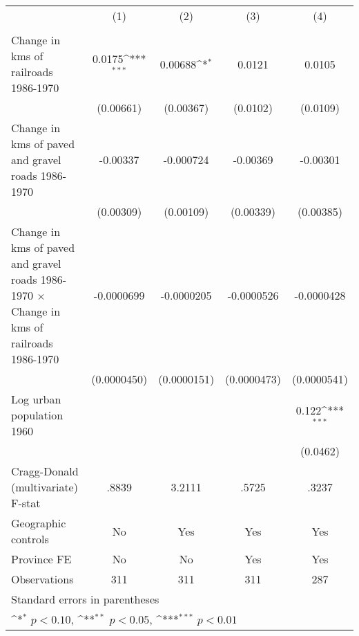 {
\def\sym#1{\ifmmode^{#1}\else\(^{#1}\)\fi}
\begin{tabular}{l*{4}{c}}
\hline\hline
                &\multicolumn{1}{c}{(1)}&\multicolumn{1}{c}{(2)}&\multicolumn{1}{c}{(3)}&\multicolumn{1}{c}{(4)}\\
                &\multicolumn{1}{c}{}&\multicolumn{1}{c}{}&\multicolumn{1}{c}{}&\multicolumn{1}{c}{}\\
\hline
Change in kms of railroads 1986-1970&   0.0175\sym{***}&  0.00688\sym{*}  &   0.0121         &   0.0105         \\
                &(0.00661)         &(0.00367)         & (0.0102)         & (0.0109)         \\
[1em]
Change in kms of paved and gravel roads 1986-1970& -0.00337         &-0.000724         & -0.00369         & -0.00301         \\
                &(0.00309)         &(0.00109)         &(0.00339)         &(0.00385)         \\
[1em]
Change in kms of paved and gravel roads 1986-1970 $\times$ Change in kms of railroads 1986-1970&-0.0000699         &-0.0000205         &-0.0000526         &-0.0000428         \\
                &(0.0000450)         &(0.0000151)         &(0.0000473)         &(0.0000541)         \\
[1em]
Log urban population 1960&                  &                  &                  &    0.122\sym{***}\\
                &                  &                  &                  & (0.0462)         \\
\hline
Cragg-Donald (multivariate) F-stat&    .8839         &   3.2111         &    .5725         &    .3237         \\
Geographic controls&       No         &      Yes         &      Yes         &      Yes         \\
Province FE     &       No         &       No         &      Yes         &      Yes         \\
Observations    &      311         &      311         &      311         &      287         \\
\hline\hline
\multicolumn{5}{l}{\footnotesize Standard errors in parentheses}\\
\multicolumn{5}{l}{\footnotesize \sym{*} \(p<0.10\), \sym{**} \(p<0.05\), \sym{***} \(p<0.01\)}\\
\end{tabular}
}
